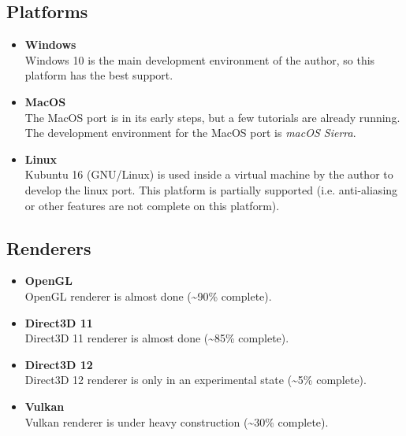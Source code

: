 \documentclass{article}
\begin{document}
\subsection{Platforms}
\begin{itemize}
	\item \textbf{Windows} \\
	Windows 10 is the main development environment of the author, so this platform has the best support.
	
	\item \textbf{MacOS} \\
	The MacOS port is in its early steps, but a few tutorials are already running.
	The development environment for the MacOS port is \emph{macOS Sierra}.
	
	\item \textbf{Linux} \\
	Kubuntu 16 (GNU/Linux) is used inside a virtual machine by the author to develop the linux port.
	This platform is partially supported (i.e. anti-aliasing or other features are not complete on this platform).
\end{itemize}
	
\subsection{Renderers}
\begin{itemize}
	\item \textbf{OpenGL} \\
	OpenGL renderer is almost done (\textasciitilde 90\% complete).
	
	\item \textbf{Direct3D 11} \\
	Direct3D 11 renderer is almost done (\textasciitilde 85\% complete).
	
	\item \textbf{Direct3D 12} \\
	Direct3D 12 renderer is only in an experimental state (\textasciitilde 5\% complete).
	
	\item \textbf{Vulkan} \\
	Vulkan renderer is under heavy construction (\textasciitilde 30\% complete).
\end{itemize}


\end{document}
